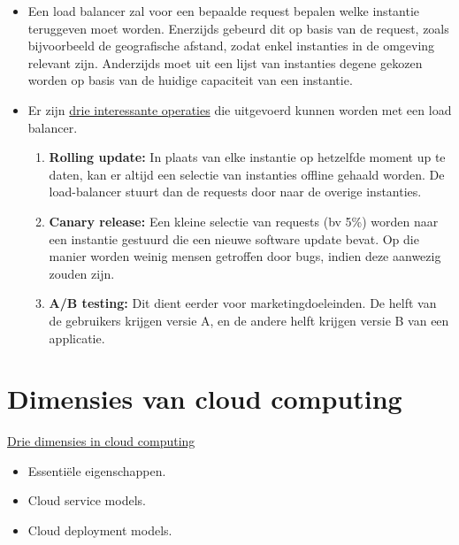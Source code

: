 \begin{itemize}
		\item  Een load balancer zal voor een bepaalde request bepalen welke instantie teruggeven moet worden. Enerzijds gebeurd dit op basis van de request, zoals bijvoorbeeld de geografische afstand, zodat enkel instanties in de omgeving relevant zijn. Anderzijds moet uit een lijst van instanties degene gekozen worden op basis van de huidige capaciteit van een instantie.

		\item  Er zijn \underline{drie interessante operaties} die uitgevoerd kunnen worden met een load balancer.
		\begin{enumerate}
			\item \textbf{Rolling update:} In plaats van elke instantie op hetzelfde moment up te daten, kan er altijd een selectie van instanties offline gehaald worden. De load-balancer stuurt dan de requests door naar de overige instanties.
			\item \textbf{Canary release:} Een kleine selectie van requests (bv 5\%) worden naar een instantie gestuurd die een nieuwe software update bevat. Op die manier worden weinig mensen getroffen door bugs, indien deze aanwezig zouden zijn.  
			\item \textbf{A/B testing:} Dit dient eerder voor marketingdoeleinden. De helft van de gebruikers krijgen versie A, en de andere helft krijgen versie B van een applicatie.
		\end{enumerate}
	\end{itemize}

	\chapter{Dimensies van cloud computing}
	\underline{Drie dimensies in cloud computing}
	\begin{itemize}
		\item  Essentiële eigenschappen.
		\item  Cloud service models.
		\item  Cloud deployment models.
	\end{itemize}

